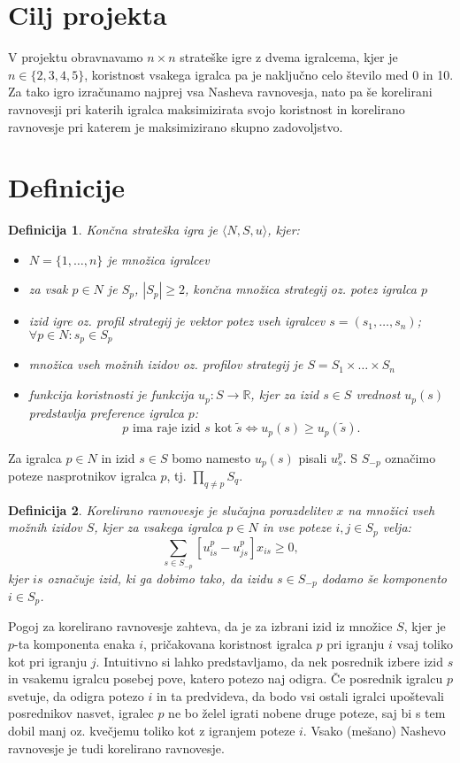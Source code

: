 \documentclass{article}
\newtheorem{definition}{Definicija}
\begin{document}
\section{Cilj projekta}
V projektu obravnavamo $n\times n$ strateške igre z dvema igralcema, kjer je $n \in \{2,3,4,5\}$, koristnost vsakega igralca pa je naključno celo število med 0 in 10. Za tako igro izračunamo najprej vsa Nasheva ravnovesja, nato pa še korelirani ravnovesji pri katerih igralca maksimizirata svojo koristnost in korelirano ravnovesje pri katerem je maksimizirano skupno zadovoljstvo. 

\section{Definicije}
\begin{definition}
    \emph{Končna strateška igra} je $\langle N, S, u \rangle$, kjer:
    \begin{itemize}
        \item $N = \{ 1, \dots, n \}$ je \emph{množica igralcev}
        \item za vsak $p \in N$ je $S_p$, $|S_p|\geq 2$, končna množica \emph{strategij} oz. \emph{potez} igralca $p$
        \item \emph{izid igre} oz. \emph{profil strategij} je vektor potez vseh igralcev $s = (s_1, \dots, s_n)$; $\forall p \in N: s_p \in S_p$
        \item \emph{množica vseh možnih izidov} oz. \emph{profilov strategij} je $S = S_1 \times \dots \times S_n$ 
        \item \emph{funkcija koristnosti} je funkcija $u_p: S \to \mathbb{R}$, kjer za izid $s \in S$ vrednost $u_p(s)$ predstavlja preference igralca $p$: 
        $$ \text{$p$ ima raje izid $s$ kot $\tilde{s}$} \iff u_p(s) \geq u_p(\tilde{s}). $$
    \end{itemize}
\end{definition}
Za igralca $p\in N$ in izid $s \in S$ bomo namesto $u_p(s)$ pisali $u_s^p$. S $S_{-p}$ označimo poteze nasprotnikov igralca $p$, tj. $\prod\limits_{q \neq p} S_q$.

\begin{definition}
    \emph{Korelirano ravnovesje} je slučajna porazdelitev $x$ na množici vseh možnih izidov $S$, kjer za vsakega igralca $p\in N$ in vse poteze $i,j\in S_p$ velja:
    $$ \sum_{s\in S_{-p}} [u_{is}^p - u_{js}^p] x_{is} \geq 0, $$
kjer $is$ označuje izid, ki ga dobimo tako, da izidu $s \in S_{-p}$ dodamo še komponento $i\in S_p$.
\end{definition}
Pogoj za korelirano ravnovesje zahteva, da je za izbrani izid iz množice $S$, kjer je $p$-ta komponenta enaka $i$, pričakovana koristnost igralca $p$ pri igranju $i$ vsaj toliko kot pri igranju $j$. Intuitivno si lahko predstavljamo, da nek posrednik izbere izid $s$ in vsakemu igralcu posebej pove, katero potezo naj odigra. Če posrednik igralcu $p$ svetuje, da odigra potezo $i$ in ta predvideva, da bodo vsi ostali igralci upoštevali posrednikov nasvet, igralec $p$ ne bo želel igrati nobene druge poteze, saj bi s tem dobil manj oz. kvečjemu toliko kot z igranjem poteze $i$. Vsako (mešano) Nashevo ravnovesje je tudi korelirano ravnovesje.
\end{document}
